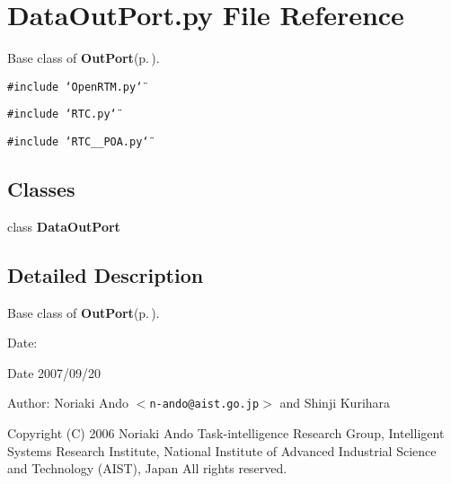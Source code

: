 \section{Data\-Out\-Port.py File Reference}
\label{DataOutPort_8py}
Base class of {\bf Out\-Port}{\rm (p.\,\pageref{classOutPort})}. 

{\tt \#include \char`\"{}Open\-RTM.py\char`\"{}}\par
{\tt \#include \char`\"{}RTC.py\char`\"{}}\par
{\tt \#include \char`\"{}RTC\_\-\_\-POA.py\char`\"{}}\par
\subsection*{Classes}
\begin{CompactItemize}
\item 
class {\bf Data\-Out\-Port}
\end{CompactItemize}


\subsection{Detailed Description}
Base class of {\bf Out\-Port}{\rm (p.\,\pageref{classOutPort})}. 

\begin{Desc}
\item[Date:]\begin{Desc}
\item[Date]2007/09/20 \end{Desc}
\end{Desc}
\begin{Desc}
\item[Author:]Noriaki Ando $<${\tt n-ando@aist.go.jp}$>$ and Shinji Kurihara\end{Desc}
Copyright (C) 2006 Noriaki Ando Task-intelligence Research Group, Intelligent Systems Research Institute, National Institute of Advanced Industrial Science and Technology (AIST), Japan All rights reserved.